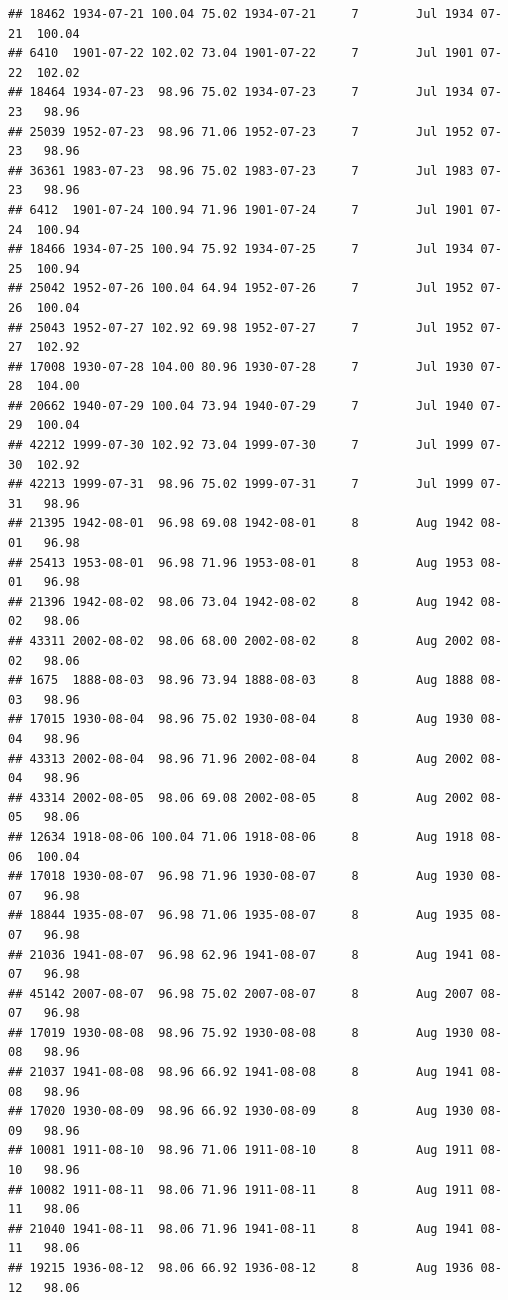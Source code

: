 \documentclass{article}\usepackage[]{graphicx}\usepackage[]{color}
\makeatletter
\newenvironment{kframe}{%
 \def\at@end@of@kframe{}%
 \ifinner\ifhmode%
  \def\at@end@of@kframe{\end{minipage}}%
  \begin{minipage}{\columnwidth}%
 \fi\fi%
 \def\FrameCommand##1{\hskip\@totalleftmargin \hskip-\fboxsep
 \colorbox{shadecolor}{##1}\hskip-\fboxsep
     \hskip-\linewidth \hskip-\@totalleftmargin \hskip\columnwidth}%
 \MakeFramed {\advance\hsize-\width
   \@totalleftmargin\z@ \linewidth\hsize
   \@setminipage}}%
 {\par\unskip\endMakeFramed%
 \at@end@of@kframe}
\newenvironment{knitrout}{}{} %
\makeatother
\begin{document}
\begin{knitrout}
\begin{kframe}
\begin{verbatim}
## 18462 1934-07-21 100.04 75.02 1934-07-21     7        Jul 1934 07-21  100.04
## 6410  1901-07-22 102.02 73.04 1901-07-22     7        Jul 1901 07-22  102.02
## 18464 1934-07-23  98.96 75.02 1934-07-23     7        Jul 1934 07-23   98.96
## 25039 1952-07-23  98.96 71.06 1952-07-23     7        Jul 1952 07-23   98.96
## 36361 1983-07-23  98.96 75.02 1983-07-23     7        Jul 1983 07-23   98.96
## 6412  1901-07-24 100.94 71.96 1901-07-24     7        Jul 1901 07-24  100.94
## 18466 1934-07-25 100.94 75.92 1934-07-25     7        Jul 1934 07-25  100.94
## 25042 1952-07-26 100.04 64.94 1952-07-26     7        Jul 1952 07-26  100.04
## 25043 1952-07-27 102.92 69.98 1952-07-27     7        Jul 1952 07-27  102.92
## 17008 1930-07-28 104.00 80.96 1930-07-28     7        Jul 1930 07-28  104.00
## 20662 1940-07-29 100.04 73.94 1940-07-29     7        Jul 1940 07-29  100.04
## 42212 1999-07-30 102.92 73.04 1999-07-30     7        Jul 1999 07-30  102.92
## 42213 1999-07-31  98.96 75.02 1999-07-31     7        Jul 1999 07-31   98.96
## 21395 1942-08-01  96.98 69.08 1942-08-01     8        Aug 1942 08-01   96.98
## 25413 1953-08-01  96.98 71.96 1953-08-01     8        Aug 1953 08-01   96.98
## 21396 1942-08-02  98.06 73.04 1942-08-02     8        Aug 1942 08-02   98.06
## 43311 2002-08-02  98.06 68.00 2002-08-02     8        Aug 2002 08-02   98.06
## 1675  1888-08-03  98.96 73.94 1888-08-03     8        Aug 1888 08-03   98.96
## 17015 1930-08-04  98.96 75.02 1930-08-04     8        Aug 1930 08-04   98.96
## 43313 2002-08-04  98.96 71.96 2002-08-04     8        Aug 2002 08-04   98.96
## 43314 2002-08-05  98.06 69.08 2002-08-05     8        Aug 2002 08-05   98.06
## 12634 1918-08-06 100.04 71.06 1918-08-06     8        Aug 1918 08-06  100.04
## 17018 1930-08-07  96.98 71.96 1930-08-07     8        Aug 1930 08-07   96.98
## 18844 1935-08-07  96.98 71.06 1935-08-07     8        Aug 1935 08-07   96.98
## 21036 1941-08-07  96.98 62.96 1941-08-07     8        Aug 1941 08-07   96.98
## 45142 2007-08-07  96.98 75.02 2007-08-07     8        Aug 2007 08-07   96.98
## 17019 1930-08-08  98.96 75.92 1930-08-08     8        Aug 1930 08-08   98.96
## 21037 1941-08-08  98.96 66.92 1941-08-08     8        Aug 1941 08-08   98.96
## 17020 1930-08-09  98.96 66.92 1930-08-09     8        Aug 1930 08-09   98.96
## 10081 1911-08-10  98.96 71.06 1911-08-10     8        Aug 1911 08-10   98.96
## 10082 1911-08-11  98.06 71.96 1911-08-11     8        Aug 1911 08-11   98.06
## 21040 1941-08-11  98.06 71.96 1941-08-11     8        Aug 1941 08-11   98.06
## 19215 1936-08-12  98.06 66.92 1936-08-12     8        Aug 1936 08-12   98.06

\end{verbatim}
\end{kframe}
\end{knitrout}
\end{document}

